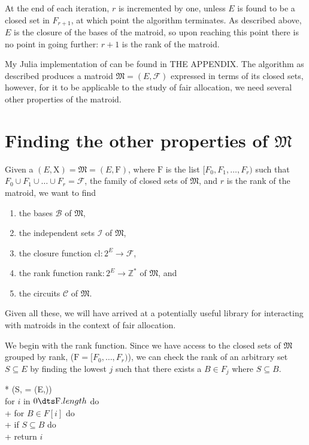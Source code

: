 At the end of each iteration, $r$ is incremented by one, unless $E$ is found to be a closed set in $F_{r+1}$, at which point the algorithm terminates. As described above, $E$ is the closure of the bases of the matroid, so upon reaching this point there is no point in going further: $r+1$ is the rank of the matroid.

My Julia implementation of  can be found in THE APPENDIX. The algorithm as described produces a matroid $\mathfrak{M} = (E, \mathcal{F})$ expressed in terms of its closed sets, however, for it to be applicable to the study of fair allocation, we need several other properties of the matroid.



\section*{Finding the other properties of $\mathfrak{M}$}
Given a $(E, \mathrm{X}) = \mathfrak{M} = (E, \mathrm{F})$, where $\mathrm{F}$ is the list $[F_0, F_1, \ldots, F_r)$ such that $F_0 \cup F_1 \cup \ldots \cup F_r = \mathcal{F}$, the family of closed sets of $\mathfrak{M}$, and $r$ is the rank of the matroid, we want to find
\begin{enumerate}
  \item the bases $\mathcal{B}$ of $\mathfrak{M}$,
  \item the independent sets $\mathcal{I}$ of $\mathfrak{M}$,
  \item the closure function $\text{cl} : 2^E \to \mathcal{F}$,
  \item the rank function $\text{rank} : 2^E \to \mathbb{Z}^*$ of $\mathfrak{M}$, and
  \item the circuits $\mathcal{C}$ of $\mathfrak{M}$.
\end{enumerate}

Given all these, we will have arrived at a potentially useful library for interacting with matroids in the context of fair allocation.

We begin with the rank function. Since we have access to the closed sets of $\mathfrak{M}$ grouped by rank, ($\mathrm{F} = [F_0, \ldots, F_r)$), we can check the rank of an arbitrary set $S \subseteq E$ by finding the lowest $j$ such that there exists a $B \in F_j$ where $S \subseteq B$.

\begin{pseudo}*
  ({S,  = (E,)})\\
  for $i$ in $0 \dts \mathrm{F}.length$ do \\+
  for $B \in F[i]$ do \\+
  if $S \subseteq B$ do \\+
  return $i$ 
\end{pseudo}

